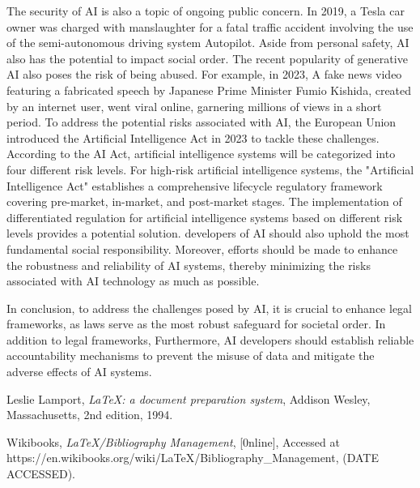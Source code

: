\documentclass[a4paper,11pt]{article}
\begin{document}
\noindent
The security of AI is also a topic of ongoing public concern. In 2019, a Tesla car owner was charged with manslaughter for 
a fatal traffic accident involving the use of the semi-autonomous driving system Autopilot. Aside from personal safety, AI also has the potential to impact social order. The recent popularity of generative AI also poses the risk of being abused.
For example, in 2023, A fake news video featuring a fabricated speech by Japanese Prime Minister Fumio Kishida, created by an internet user, went viral online, garnering millions of views in a short period. To address the potential risks
associated with AI, the European Union introduced the Artificial Intelligence Act in 2023 to tackle these challenges. According to the AI Act, artificial intelligence systems will be categorized into four different risk levels.
For high-risk artificial intelligence systems, the "Artificial Intelligence Act" establishes a comprehensive lifecycle regulatory framework covering pre-market, in-market, and post-market stages. The implementation of differentiated regulation 
for artificial intelligence systems based on different risk levels provides a potential solution. developers of AI should also uphold 
the most fundamental social responsibility. Moreover, efforts should be made to enhance the robustness and reliability of AI systems, thereby minimizing the risks associated with AI technology as much as possible.

\noindent
In conclusion, to address the challenges posed by AI, it is crucial to enhance legal frameworks, as laws serve as the most robust safeguard for societal order. In addition to legal frameworks, 
Furthermore, AI developers should establish reliable accountability mechanisms to prevent the misuse of data and mitigate the adverse effects of AI systems.












\begin{thebibliography}{99}

  Leslie Lamport,
  \textit{\LaTeX: a document preparation system},
  Addison Wesley, Massachusetts,
  2nd edition,
  1994.
  
    Wikibooks,
    \textit{LaTeX/Bibliography Management},
    [0nline],
    Accessed at https://en.wikibooks.org/wiki/LaTeX/Bibliography\_Management,
    (DATE ACCESSED).
    

\end{thebibliography}
\end{document}
